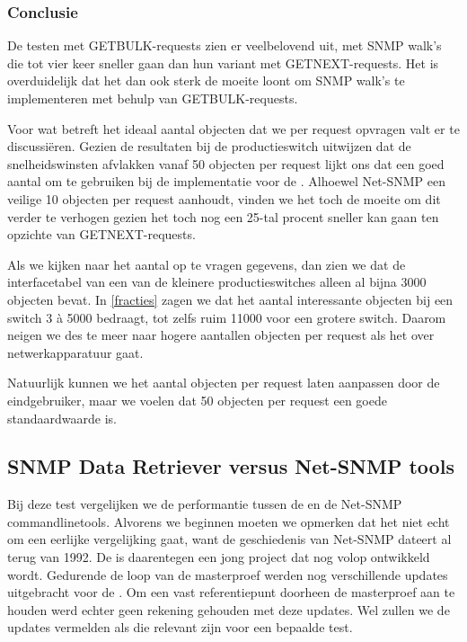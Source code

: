 \subsubsection{Conclusie}

De testen met GETBULK-requests zien er veelbelovend uit, met SNMP walk's die tot vier keer sneller gaan dan hun variant met GETNEXT-requests.
Het is overduidelijk dat het dan ook sterk de moeite loont om SNMP walk's te implementeren met behulp van GETBULK-requests.

Voor wat betreft het ideaal aantal objecten dat we per request opvragen valt er te discussiëren.
Gezien de resultaten bij de productieswitch uitwijzen dat de snelheidswinsten afvlakken vanaf 50 objecten per request lijkt ons dat een goed aantal
om te gebruiken bij de implementatie voor de \nwmretriever.
Alhoewel Net-SNMP een veilige 10 objecten per request aanhoudt,
vinden we het toch de moeite om dit verder te verhogen gezien het toch nog een 25-tal procent sneller kan gaan ten opzichte van GETNEXT-requests.

Als we kijken naar het aantal op te vragen gegevens, dan zien we dat de interfacetabel van een van de kleinere productieswitches alleen al bijna 3000 objecten bevat.
In \cref{fracties} zagen we dat het aantal interessante objecten bij een switch 3 à 5000 bedraagt, tot zelfs ruim 11000 voor een grotere switch.
Daarom neigen we des te meer naar hogere aantallen objecten per request als het over netwerkapparatuur gaat.

Natuurlijk kunnen we het aantal objecten per request laten aanpassen door de eindgebruiker,
maar we voelen dat 50 objecten per request een goede standaardwaarde is.




\subsection{SNMP Data Retriever versus Net-SNMP tools}


Bij deze test vergelijken we de performantie tussen de \nwmretriever{} en de Net-SNMP commandlinetools.
Alvorens we beginnen moeten we opmerken dat het niet echt om een eerlijke vergelijking gaat,
want de geschiedenis van Net-SNMP dateert al terug van 1992\cite{net-snmp-history}.
De \nwmretriever{} is daarentegen een jong project dat nog volop ontwikkeld wordt.
Gedurende de loop van de masterproef werden nog verschillende updates uitgebracht voor de \nwmretriever{}.
Om een vast referentiepunt doorheen de masterproef aan te houden werd echter geen rekening gehouden met deze updates.
Wel zullen we de updates vermelden als die relevant zijn voor een bepaalde test.

